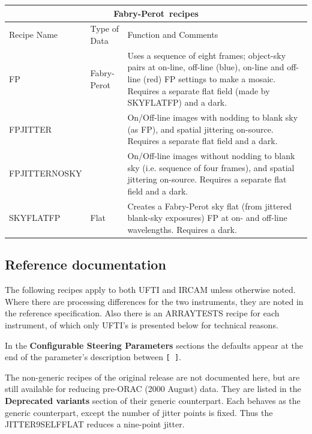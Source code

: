 \documentclass[twoside,11pt]{article}
\newcommand{\htmladdnormallink}[2]{#1}
\newcommand{\htmlref}[2]{#1}
\renewcommand{\_}{\texttt{\symbol{95}}}
\newcommand{\FP}{\htmladdnormallink{Fabry-Perot}{http://www.jach.hawaii.edu/JACpublic/UKIRT/instruments/ufti/ufti_fp.html}}
\begin{document}
\begin{center}
\begin{tabular}{|l|p{25mm}|p{81mm}|}
\multicolumn{3}{c}{\large{\bf \FP\ recipes}} \vspace*{1ex} \\
\hline
Recipe Name & Type of Data & Function and Comments \\ \hline
\htmlref{FP}{FP} & Fabry-Perot &
   Uses a sequence of eight frames; object-sky pairs at on-line,
   off-line (blue), on-line and off-line (red) FP settings to make
   a mosaic.  Requires a separate flat field (made by SKY\_FLAT\_FP)
   and a dark. \\ \hline
\htmlref{FP\_JITTER}{FP\_JITTER} & &
   On/Off-line images with nodding to blank sky (as FP), and spatial
   jittering on-source.  Requires a separate flat field and a dark. \\ \hline
\htmlref{FP\_JITTER\_NO\_SKY}{FP\_JITTER\_NO\_SKY} & &
   On/Off-line images without nodding to blank sky (i.e. sequence of
   four frames), and spatial jittering on-source. 
   Requires a separate flat field and a dark.  \\ \hline
\htmlref{SKY\_FLAT\_FP}{SKY\_FLAT\_FP} & Flat &
   Creates a Fabry-Perot sky flat (from jittered blank-sky exposures) 
   FP at on- and off-line wavelengths.  Requires a dark. \\ \hline
\end{tabular}
\end{center}
\bigskip

\newpage
\subsection{Reference documentation}

The following recipes apply to both UFTI and IRCAM unless otherwise
noted.  Where there are processing differences for the two instruments,
they are noted in the reference specification.  Also there is an
ARRAY\_TESTS recipe for each instrument, of which only UFTI's is
presented below for technical reasons.

In the {\bf Configurable Steering Parameters} sections the defaults
appear at the end of the parameter's description between {\tt [~]}.

The non-generic recipes of the original release are not documented
here, but are still available for reducing pre-ORAC (2000 August)
data.  They are listed in the {\bf Deprecated variants} section of
their generic counterpart.  Each behaves as the generic counterpart,
except the number of jitter points is fixed.  Thus the
JITTER9\_SELF\_FLAT reduces a nine-point jitter.
\bigskip\bigskip\bigskip
\end{document}
